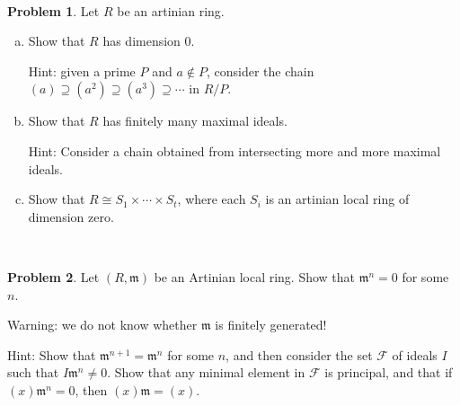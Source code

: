 \documentclass[11pt]{article}
\newcommand{\m}{\mathfrak{m}}
\theoremstyle{definition}
\newtheorem{problem}{Problem}
\begin{document}
\

\begin{problem}
	Let $R$ be an artinian ring.
	\begin{enumerate}[a)]

	\item Show that $R$ has dimension $0$.
	
	Hint: given a prime $P$ and $a \notin P$, consider the chain $(a) \supseteq (a^2) \supseteq (a^3) \supseteq \cdots$ in $R/P$.
	
	\item Show that $R$ has finitely many maximal ideals.
	
	Hint: Consider a chain obtained from intersecting more and more maximal ideals.	
	
	\item Show that $R \cong S_1 \times \cdots \times S_t$, where each $S_i$ is an artinian local ring of dimension zero.
	
	\end{enumerate}
\end{problem}

\

\begin{problem}
	Let $(R, \m)$ be an Artinian local ring. Show that $\m^n = 0$ for some $n$.
		
	Warning: we do not know whether $\m$ is finitely generated!
		
	Hint: Show that $\m^{n+1} = \m^n$ for some $n$, and then consider the set $\mathcal{F}$ of ideals $I$ such that $I \m^n \neq 0$. Show that any minimal element in $\mathcal{F}$ is principal, and that if $(x)\m^n = 0$, then $(x) \m = (x)$.
\end{problem}
\end{document}
